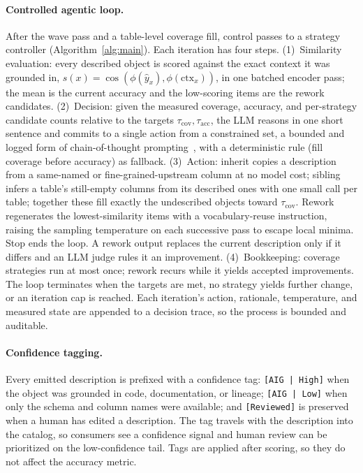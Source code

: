 \paragraph{Controlled agentic loop.} After the wave pass and a table-level coverage fill,
control passes to a strategy controller (Algorithm~\ref{alg:main}). Each iteration has four
steps. (1)~Similarity evaluation: every described object is scored against the exact
context it was grounded in, $s(x)=\cos(\phi(\hat y_x),\phi(\mathrm{ctx}_x))$, in one
batched encoder pass; the mean is the current accuracy and the low-scoring items are the
rework candidates. (2)~Decision: given the measured coverage, accuracy, and per-strategy
candidate counts relative to the targets $\tau_{\text{cov}},\tau_{\text{acc}}$, the LLM
reasons in one short sentence and commits to a single action from a constrained set, a
bounded and logged form of chain-of-thought prompting~\citep{wei2022chain}, with a
deterministic rule (fill coverage before accuracy) as fallback. (3)~Action: inherit copies
a description from a same-named or fine-grained-upstream column at no model cost; sibling
infers a table's still-empty columns from its described ones with one small call per table;
together these fill exactly the undescribed objects toward $\tau_{\text{cov}}$. Rework
regenerates the lowest-similarity items with a vocabulary-reuse instruction, raising the
sampling temperature on each successive pass to escape local minima. Stop ends the loop. A
rework output replaces the current description only if it differs and an LLM judge rules it
an improvement. (4)~Bookkeeping: coverage strategies run at most once; rework recurs while
it yields accepted improvements. The loop terminates when the targets are met, no strategy
yields further change, or an iteration cap is reached. Each iteration's action, rationale,
temperature, and measured state are appended to a decision trace, so the process is bounded
and auditable.

\paragraph{Confidence tagging.} Every emitted description is prefixed with a confidence
tag: \texttt{[AIG\,|\,High]} when the object was grounded in code, documentation, or
lineage; \texttt{[AIG\,|\,Low]} when only the schema and column names were available; and
\texttt{[Reviewed]} is preserved when a human has edited a description. The tag travels
with the description into the catalog, so consumers see a confidence signal and human
review can be prioritized on the low-confidence tail. Tags are applied after scoring, so
they do not affect the accuracy metric.

